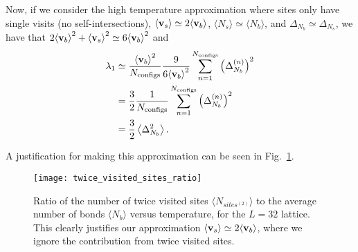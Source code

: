 \documentclass[../main.tex]{subfiles}
\begin{document}
Now, if we consider the high temperature approximation where sites only have single visits (no self-intersections),
${\langle \mathbf{v}_s\rangle} \simeq 2{\langle \mathbf{v}_b\rangle}$, $\langle N_s\rangle \simeq \langle N_b\rangle$, and $\Delta_{N_b} \simeq \Delta_{N_s}$, we
have that $2{\langle \mathbf{v}_b\rangle}^2 + {\langle \mathbf{v}_s\rangle}^2 \simeq 6{\langle \mathbf{v}_b\rangle}^2$ and
%
\begin{align}
    \lambda_1 &\simeq \frac{{\langle \mathbf{v}_b\rangle}^2}{N_{\mathrm{configs}}}\frac{9}{6{\langle \mathbf{v}_b\rangle}^2}
    \sum_{n=1}^{N_{\mathrm{configs}}} {\left(\Delta_{N_b}^{(n)}\right)}^2 \\
    &= \frac{3}{2}\frac{1}{N_{\mathrm{configs}}}\sum_{n=1}^{N_{\mathrm{configs}}}
    {\left(\Delta_{N_b}^{(n)}\right)}^2 \\
    &= \frac{3}{2}\left \langle \Delta_{N_b}^2 \right\rangle.
    \label{eq:eigval_delta_Nb2}
\end{align}

A justification for making this approximation can be seen in Fig.~\ref{fig:twice_visited_sites_ratio}. 
%
\begin{figure}[htpb]
  \centering
  \texttt{[image: twice\_visited\_sites\_ratio]}
  \caption{Ratio of the number of twice visited sites $\langle
    N_{sites^{(2)}}\rangle$ to the average number of bonds $\langle N_b\rangle$
    versus temperature, for the $L=32$ lattice. This clearly justifies our
    approximation ${\langle \mathbf{v}_s\rangle} \simeq 2{\langle \mathbf{v}_b\rangle}$, where we ignore the contribution
  from twice visited sites.}%
\label{fig:twice_visited_sites_ratio}
\end{figure}
%
\end{document}
